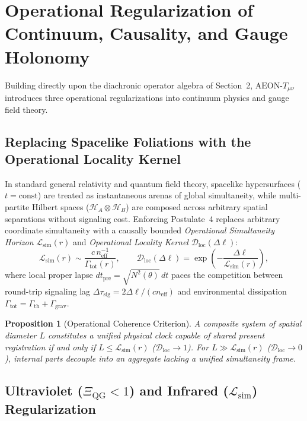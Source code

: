 \documentclass[11pt,a4paper]{article}
\newtheorem{theorem}{Proposition}
\begin{document}
\section{Operational Regularization of Continuum, Causality, and Gauge Holonomy}

Building directly upon the diachronic operator algebra of Section~2, $\text{AEON-}T_{\mu\nu}$ introduces three operational regularizations into continuum physics and gauge field theory.

\subsection{Replacing Spacelike Foliations with the Operational Locality Kernel}

In standard general relativity and quantum field theory, spacelike hypersurfaces ($t = \mathrm{const}$) are treated as instantaneous arenas of global simultaneity, while multi-partite Hilbert spaces ($\mathcal{H}_A \otimes \mathcal{H}_B$) are composed across arbitrary spatial separations without signaling cost. Enforcing Postulate~4 replaces arbitrary coordinate simultaneity with a causally bounded \emph{Operational Simultaneity Horizon} $\mathcal{L}_{\mathrm{sim}}(r)$ and \emph{Operational Locality Kernel} $\mathcal{D}_{\mathrm{loc}}(\Delta\ell)$:
\begin{equation}
\mathcal{L}_{\mathrm{sim}}(r) \sim \frac{c \, n_{\mathrm{eff}}^{-1}}{\Gamma_{\mathrm{tot}}(r)}, \qquad \mathcal{D}_{\mathrm{loc}}(\Delta\ell) = \exp\!\left(-\frac{\Delta\ell}{\mathcal{L}_{\mathrm{sim}}(r)}\right),
\end{equation}
where local proper lapse $dt_{\mathrm{pre}} = \sqrt{N^2(\theta)}\,dt$ paces the competition between round-trip signaling lag $\Delta\tau_{\mathrm{sig}} = 2\Delta\ell / (c n_{\mathrm{eff}})$ and environmental dissipation $\Gamma_{\mathrm{tot}} = \Gamma_{\mathrm{th}} + \Gamma_{\mathrm{grav}}$.

\begin{theorem}[Operational Coherence Criterion]
A composite system of spatial diameter $L$ constitutes a unified physical clock capable of shared present registration if and only if $L \le \mathcal{L}_{\mathrm{sim}}(r)$ ($\mathcal{D}_{\mathrm{loc}} \to 1$). For $L \gg \mathcal{L}_{\mathrm{sim}}(r)$ ($\mathcal{D}_{\mathrm{loc}} \to 0$), internal parts decouple into an aggregate lacking a unified simultaneity frame.
\end{theorem}

\subsection{Ultraviolet ($\Xi_{\mathrm{QG}} < 1$) and Infrared ($\mathcal{L}_{\mathrm{sim}}$) Regularization}
\end{document}
